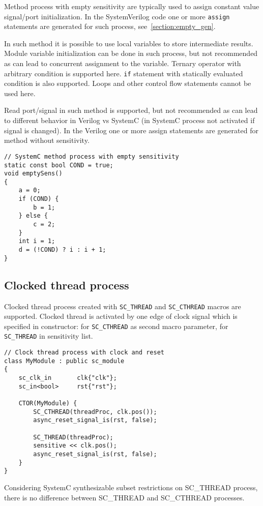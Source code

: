 Method process with empty sensitivity are typically used to assign constant value signal/port initialization. In the SystemVerilog code one or more {\tt assign} statements are generated for such process, see~\ref{section:empty_gen}. 

In such method it is possible to use local variables to store intermediate results. Module variable initialization can be done in such process, but not recommended as can lead to concurrent assignment to the variable. Ternary operator with arbitrary condition is supported here. {\tt if} statement with statically evaluated condition is also supported. Loops and other control flow statements cannot be used here.

Read port/signal in such method is supported, but not recommended as can lead to different behavior in Verilog vs SystemC (in SystemC process not activated if signal is changed). In the Verilog one or more assign statements are generated for method without sensitivity. 

\begin{lstlisting}[style=mycpp]
// SystemC method process with empty sensitivity
static const bool COND = true;
void emptySens()
{
    a = 0;
    if (COND) {
        b = 1;
    } else {
        c = 2;
    }
    int i = 1;
    d = (!COND) ? i : i + 1; 
}
\end{lstlisting}


\subsection{Clocked thread process}

Clocked thread process created with {\tt SC\_THREAD} and {\tt SC\_CTHREAD} macros are supported.  
Clocked thread is activated by one edge of clock signal which is specified in constructor: for {\tt SC\_CTHREAD} as second macro parameter, for {\tt SC\_THREAD} in sensitivity list. 
%
\begin{lstlisting}[style=mycpp]
// Clock thread process with clock and reset
class MyModule : public sc_module 
{
    sc_clk_in       clk{"clk"};
    sc_in<bool>     rst{"rst"};
    
	CTOR(MyModule) {
        SC_CTHREAD(threadProc, clk.pos());
        async_reset_signal_is(rst, false);
        
        SC_THREAD(threadProc);
        sensitive << clk.pos();
        async_reset_signal_is(rst, false);
	}     
}
\end{lstlisting}
%
Considering SystemC synthesizable subset restrictions on SC\_THREAD process, there is no difference between SC\_THREAD and SC\_CTHREAD processes.

